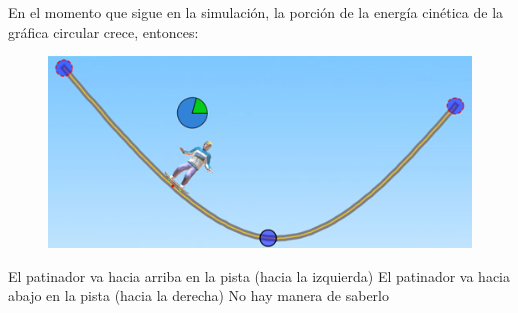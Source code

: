 En el momento que sigue en la simulación, la porción de la energía cinética de la gráfica circular crece, entonces:

\begin{minipage}{0.3\textwidth}
    \begin{figure}[H]
        \includegraphics[width=\linewidth]{../images/q028c}
    \end{figure}
\end{minipage}\hfill
\begin{minipage}{0.6\textwidth}
    \begin{choices}
        \choice El patinador va hacia arriba en la pista (hacia la izquierda)
        \choice El patinador va hacia abajo en la pista (hacia la derecha)
        \choice No hay manera de saberlo
    \end{choices}
\end{minipage}
